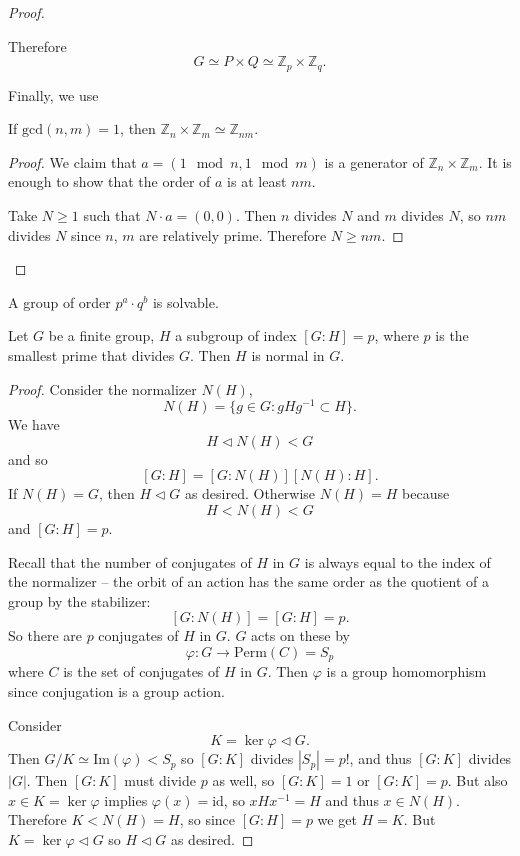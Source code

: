 \documentclass{article}
\begin{document}
\begin{proof}
\begin{enumerate}
{      Therefore
      $$
      G \simeq P \times Q \simeq \mathbb{Z}_p \times \mathbb{Z}_q.
      $$

      Finally, we use
      \begin{lemma}
        If $\mathrm{gcd}(n, m) = 1$, then
        $\mathbb{Z}_n \times \mathbb{Z}_m \simeq \mathbb{Z}_{nm}$.
      \end{lemma}
      \begin{proof}
        We claim that $a = (1 \mod n, 1 \mod m)$ is a generator of
        $\mathbb{Z}_n \times \mathbb{Z}_m$. It is enough to show that
        the order of $a$ is at least $nm$.

        Take $N \geq 1$ such that $N \cdot a = (0, 0)$. Then
        $n$ divides $N$ and $m$ divides $N$, so $nm$ divides $N$ since
        $n$, $m$ are relatively prime. Therefore $N \geq n m$.
      \end{proof}
    }
  \end{enumerate}
\end{proof}

\begin{theorem}
  A group of order $p^a \cdot q^b$ is solvable.
\end{theorem}

\begin{prop}
  Let $G$ be a finite group, $H$ a subgroup of index
  $[G : H] = p$, where $p$ is the smallest prime that divides
  $G$. Then $H$ is normal in $G$.
\end{prop}
\begin{proof}
  Consider the normalizer $N(H)$,
  $$
  N(H) = \{ g \in G :  gHg^{-1} \subset H \}.
  $$
  We have
  $$
  H \triangleleft N(H) < G
  $$
  and so
  $$
  [G : H] = [G : N(H)] [N(H) : H].
  $$
  If $N(H) = G$, then $H \triangleleft G$ as desired.
  Otherwise $N(H) = H$ because
  $$
  H < N(H) < G
  $$
  and $[G : H] = p$.

  Recall that the number of conjugates of $H$ in $G$ is always equal
  to the index of the normalizer -- the orbit of an action has the
  same order as the quotient of a group by the stabilizer:
  $$
  [G : N(H)] = [G : H] = p.
  $$
  So there are $p$ conjugates of $H$ in $G$. $G$ acts on these by
  $$
  \varphi : G \to \mathrm{Perm}(C) = S_p
  $$
  where $C$ is the set of conjugates of $H$ in $G$. Then $\varphi$ is
  a group homomorphism since conjugation is a group action.

  Consider
  $$
  K = \ker \varphi \triangleleft G.
  $$
  Then $G / K \simeq \mathrm{Im}(\varphi) < S_p$ so
  $[G : K]$ divides $|S_p| = p!$, and thus $[G : K]$ divides $|G|$.
  Then $[G:K]$ must divide $p$ as well, so $[G : K] = 1$ or
  $[G : K] = p$. But also $x \in K = \ker \varphi$ implies
  $\varphi(x) = \mathrm{id}$, so $x H x^{-1} = H$ and thus
  $x \in N(H)$. Therefore $K < N(H) = H$, so since
  $[G : H] = p$ we get $H = K$. But
  $K = \ker \varphi \triangleleft G$ so $H \triangleleft G$ as desired.
\end{proof}
\end{document}
